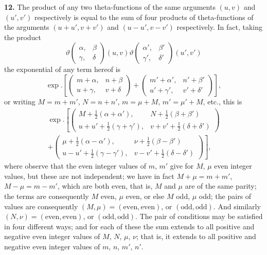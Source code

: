 \documentclass[12pt,a4paper]{article}
\theoremstyle{definition}
\begin{document}
\noindent\textbf{12.}\quad
The product of any two theta-functions of the same arguments $(u, v)$ and $(u', v')$ respectively is equal to the sum of four products of theta-functions of the arguments $(u + u', v + v')$ and $(u - u', v - v')$ respectively. In fact, taking the product
\[
\vartheta\begin{pmatrix} \alpha, & \beta \\ \gamma, & \delta \end{pmatrix}(u, v)
\vartheta\begin{pmatrix} \alpha', & \beta' \\ \gamma', & \delta' \end{pmatrix}(u', v')
\]
the exponential of any term hereof is
\[
\exp.\left[\begin{pmatrix} m + \alpha, & n + \beta \\ u + \gamma, & v + \delta \end{pmatrix} + \begin{pmatrix} m' + \alpha', & n' + \beta' \\ u' + \gamma', & v' + \delta' \end{pmatrix}\right],
\]
or writing $M = m + m'$, $N = n + n'$, $m = \mu + M$, $m' = \mu' + M$, etc., this is
\begin{multline*}
\exp.\left[\begin{pmatrix} M + \tfrac{1}{2}(\alpha + \alpha'), & N + \tfrac{1}{2}(\beta + \beta') \\ u + u' + \tfrac{1}{2}(\gamma + \gamma'), & v + v' + \tfrac{1}{2}(\delta + \delta') \end{pmatrix}\right. \\
+ \left.\begin{pmatrix} \mu + \tfrac{1}{2}(\alpha - \alpha'), & \nu + \tfrac{1}{2}(\beta - \beta') \\ u - u' + \tfrac{1}{2}(\gamma - \gamma'), & v - v' + \tfrac{1}{2}(\delta - \delta') \end{pmatrix}\right],
\end{multline*}
where observe that the even integer values of $m$, $m'$ give for $M$, $\mu$ even integer values, but these are not independent; we have in fact $M + \mu = m + m'$, $M - \mu = m - m'$, which are both even, that is, $M$ and $\mu$ are of the same parity; the terms are consequently $M$ even, $\mu$ even, or else $M$ odd, $\mu$ odd; the pairs of values are consequently $(M, \mu) = (\text{even}, \text{even})$, or $(\text{odd}, \text{odd})$. And similarly $(N, \nu) = (\text{even}, \text{even})$, or $(\text{odd}, \text{odd})$. The pair of conditions may be satisfied in four different ways; and for each of these the sum extends to all positive and negative even integer values of $M$, $N$, $\mu$, $\nu$; that is, it extends to all positive and negative even integer values of $m$, $n$, $m'$, $n'$.
\end{document}
